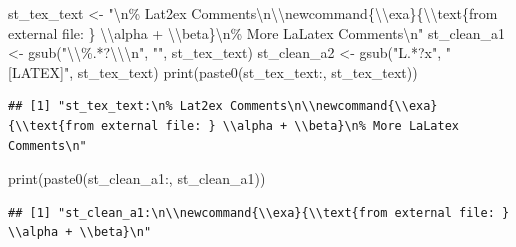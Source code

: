 \documentclass[
]{book}
\newenvironment{Shaded}{\begin{snugshade}}{\end{snugshade}}
\newcommand{\FunctionTok}[1]{\textcolor[rgb]{0.00,0.00,0.00}{#1}}
\newcommand{\NormalTok}[1]{#1}
\newcommand{\OtherTok}[1]{\textcolor[rgb]{0.56,0.35,0.01}{#1}}
\newcommand{\SpecialCharTok}[1]{\textcolor[rgb]{0.00,0.00,0.00}{#1}}
\newcommand{\StringTok}[1]{\textcolor[rgb]{0.31,0.60,0.02}{#1}}
\begin{document}
\begin{Shaded}
\begin{Highlighting}[]
\NormalTok{st\_tex\_text }\OtherTok{\textless{}{-}} \StringTok{"}\SpecialCharTok{\textbackslash{}n}\StringTok{\% Lat2ex Comments}\SpecialCharTok{\textbackslash{}n\textbackslash{}\textbackslash{}}\StringTok{newcommand\{}\SpecialCharTok{\textbackslash{}\textbackslash{}}\StringTok{exa\}\{}\SpecialCharTok{\textbackslash{}\textbackslash{}}\StringTok{text\{from external file: \} }\SpecialCharTok{\textbackslash{}\textbackslash{}}\StringTok{alpha + }\SpecialCharTok{\textbackslash{}\textbackslash{}}\StringTok{beta\}}\SpecialCharTok{\textbackslash{}n}\StringTok{\% More LaLatex Comments}\SpecialCharTok{\textbackslash{}n}\StringTok{"}
\NormalTok{st\_clean\_a1 }\OtherTok{\textless{}{-}} \FunctionTok{gsub}\NormalTok{(}\StringTok{"}\SpecialCharTok{\textbackslash{}\textbackslash{}}\StringTok{\%.*?}\SpecialCharTok{\textbackslash{}\textbackslash{}\textbackslash{}n}\StringTok{"}\NormalTok{, }\StringTok{""}\NormalTok{, st\_tex\_text)}
\NormalTok{st\_clean\_a2 }\OtherTok{\textless{}{-}} \FunctionTok{gsub}\NormalTok{(}\StringTok{"L.*?x"}\NormalTok{, }\StringTok{"[LATEX]"}\NormalTok{, st\_tex\_text)}
\FunctionTok{print}\NormalTok{(}\FunctionTok{paste0}\NormalTok{(}\StringTok{\textquotesingle{}st\_tex\_text:\textquotesingle{}}\NormalTok{, st\_tex\_text))}
\end{Highlighting}
\end{Shaded}

\begin{verbatim}
## [1] "st_tex_text:\n% Lat2ex Comments\n\\newcommand{\\exa}{\\text{from external file: } \\alpha + \\beta}\n% More LaLatex Comments\n"
\end{verbatim}

\begin{Shaded}
\begin{Highlighting}[]
\FunctionTok{print}\NormalTok{(}\FunctionTok{paste0}\NormalTok{(}\StringTok{\textquotesingle{}st\_clean\_a1:\textquotesingle{}}\NormalTok{, st\_clean\_a1))}
\end{Highlighting}
\end{Shaded}

\begin{verbatim}
## [1] "st_clean_a1:\n\\newcommand{\\exa}{\\text{from external file: } \\alpha + \\beta}\n"
\end{verbatim}
\end{document}
